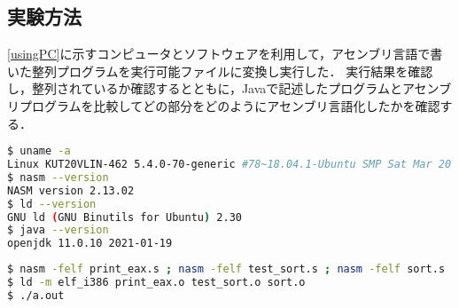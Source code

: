 \subsection{実験方法}
\ref{usingPC}に示すコンピュータとソフトウェアを利用して，アセンブリ言語で書いた整列プログラムを実行可能ファイルに変換し実行した．
実行結果を確認し，整列されているか確認するとともに，{\ttfamily Java}で記述したプログラムとアセンブリプログラムを比較してどの部分をどのようにアセンブリ言語化したかを確認する．
\begin{lstlisting}[frame={single},numbers={none},breakindent={0pt},language={Bash},caption={使用したコンピュータとソフトウェア},label={usingPC}]
$ uname -a
Linux KUT20VLIN-462 5.4.0-70-generic #78~18.04.1-Ubuntu SMP Sat Mar 20 14:10:07 UTC 2021 x86_64 x86_64 x86_64 GNU/Linux
$ nasm --version
NASM version 2.13.02
$ ld --version
GNU ld (GNU Binutils for Ubuntu) 2.30
$ java --version
openjdk 11.0.10 2021-01-19
\end{lstlisting}
\begin{lstlisting}[frame={single},numbers={none},breakindent={0pt},language={Bash},caption={アセンブル実行コマンド},label={command1}]
$ nasm -felf print_eax.s ; nasm -felf test_sort.s ; nasm -felf sort.s
$ ld -m elf_i386 print_eax.o test_sort.o sort.o
$ ./a.out
\end{lstlisting}
